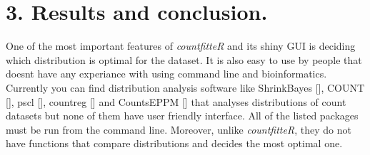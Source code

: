 % 
% 


\section{3. Results and conclusion.}

One of the most important features of \emph{countfitteR} and its shiny GUI is deciding which distribution is optimal for the dataset. It is also easy to use by people that doesnt have any experiance with using command line and bioinformatics. 
Currently you can find distribution analysis software like ShrinkBayes [], COUNT [], pscl [], countreg [] and CountsEPPM [] that analyses distributions of count datasets but none of them have user friendly interface. All of the listed packages must be run from the command line. Moreover, unlike \emph{countfitteR}, they do not have functions that compare distributions and decides the most optimal one.

